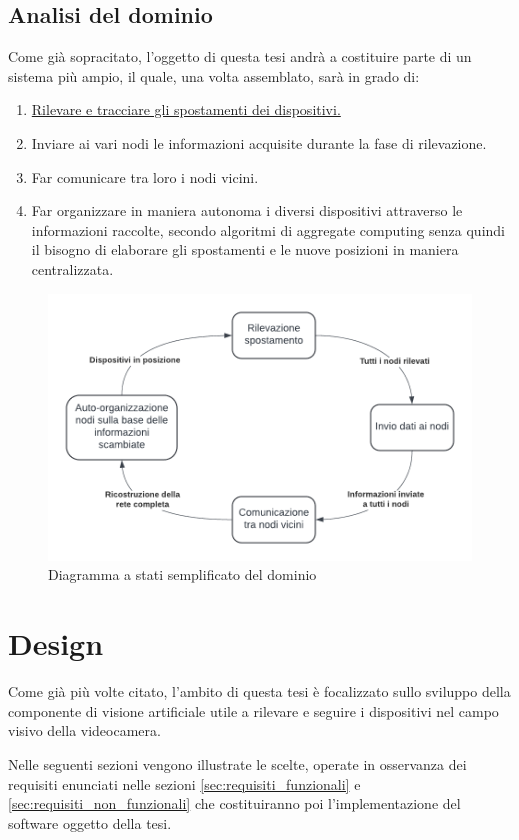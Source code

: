 \documentclass[12pt,a4paper,openright,twoside]{book}
\begin{document}
\section{Analisi del dominio}
Come già sopracitato, l’oggetto di questa tesi andrà a costituire parte di un sistema più ampio, il quale, una volta assemblato, sarà in grado di:
\begin{enumerate}
	\item \underline{Rilevare e tracciare gli spostamenti dei dispositivi.}
	\item Inviare ai vari nodi le informazioni acquisite durante la fase di rilevazione.
	\item Far comunicare tra loro i nodi vicini.
	\item Far organizzare in maniera autonoma i diversi dispositivi attraverso le informazioni raccolte, secondo algoritmi di aggregate computing senza quindi il bisogno di elaborare gli spostamenti e le nuove posizioni in maniera centralizzata.
\end{enumerate}
\begin{figure}
	\centering
	\includegraphics[width=0.8\linewidth]{./figures/UML/domainDiagram.png}
	\caption{Diagramma a stati semplificato del dominio}
	\label{fig:domain_diagram}
\end{figure}
\chapter{Design}
Come già più volte citato, l'ambito di questa tesi è focalizzato sullo sviluppo della componente di visione artificiale utile a rilevare e seguire i dispositivi nel campo visivo della videocamera.

Nelle seguenti sezioni vengono illustrate le scelte, operate in osservanza dei requisiti enunciati nelle sezioni \ref{sec:requisiti_funzionali} e \ref{sec:requisiti_non_funzionali} che costituiranno poi l'implementazione del software oggetto della tesi.
\end{document}
